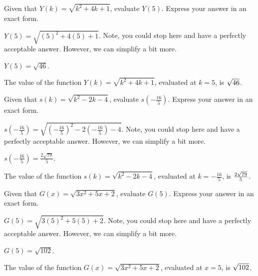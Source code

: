 \begin{shuffle}
\begin{exercise}
Given that $Y(k)=\sqrt{k^2+4 k+1}$, evaluate $Y\left(5\right)$. Express your answer in an exact form.
\begin{solution}
\begin{hint}
$Y\left(5\right)=\sqrt{(5)^2+4 (5)+1}$. Note, you could stop here and have a perfectly acceptable answer. However, we can simplify a bit more. 
\end{hint}
\begin{hint}
$Y\left(5\right)=\sqrt{46}$.
\end{hint}
The value of the function $Y(k)=\sqrt{k^2+4 k+1}$, evaluated at $k=5$, is ${\sqrt{46}}$.
\end{solution}
\end{exercise}

\begin{exercise}
Given that $s(k)=\sqrt{k^2-2 k-4}$, evaluate $s\left(-\frac{16}{5}\right)$. Express your answer in an exact form.
\begin{solution}
\begin{hint}
$s\left(-\frac{16}{5}\right)=\sqrt{(-\frac{16}{5})^2-2 (-\frac{16}{5})-4}$. Note, you could stop here and have a perfectly acceptable answer. However, we can simplify a bit more. 
\end{hint}
\begin{hint}
$s\left(-\frac{16}{5}\right)=\frac{2 \sqrt{79}}{5}$.
\end{hint}
The value of the function $s(k)=\sqrt{k^2-2 k-4}$, evaluated at $k=-\frac{16}{5}$, is ${\frac{2 \sqrt{79}}{5}}$.
\end{solution}
\end{exercise}

\begin{exercise}
Given that $G(x)=\sqrt{3 x^2+5 x+2}$, evaluate $G\left(5\right)$. Express your answer in an exact form.
\begin{solution}
\begin{hint}
$G\left(5\right)=\sqrt{3 (5)^2+5 (5)+2}$. Note, you could stop here and have a perfectly acceptable answer. However, we can simplify a bit more. 
\end{hint}
\begin{hint}
$G\left(5\right)=\sqrt{102}$.
\end{hint}
The value of the function $G(x)=\sqrt{3 x^2+5 x+2}$, evaluated at $x=5$, is ${\sqrt{102}}$.
\end{solution}
\end{exercise}


\end{shuffle}
